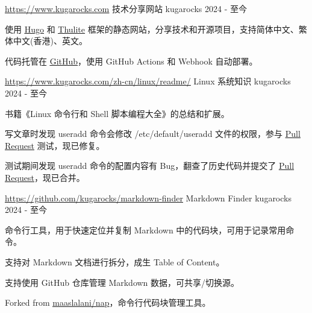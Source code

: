 

\begin{cventries}

  \cventry
    {\href{https://www.kugarocks.com}{\uline{https://www.kugarocks.com}}} %
    {技术分享网站} %
    {kugarocks} %
    {2024 - 至今} %
    {
      \begin{cvitems} %
        \item {使用 \href{https://gohugo.io/}{\uline{Hugo}} 和 \href{https://thulite.io/}{\uline{Thulite}} 框架的静态网站，分享技术和开源项目，支持简体中文、繁体中文(香港)、英文。}
        \item {代码托管在 \href{https://github.com/kugarocks/kugarocks.github.io}{\uline{GitHub}}，使用 GitHub Actions 和 Webhook 自动部署。}
      \end{cvitems}
    }

  \cventry
    {\href{https://www.kugarocks.com/zh-cn/linux/readme/}{\uline{https://www.kugarocks.com/zh-cn/linux/readme/}}} %
    {Linux 系统知识} %
    {kugarocks} %
    {2024 - 至今} %
    {
      \begin{cvitems} %
        \item {书籍《Linux 命令行和 Shell 脚本编程大全》的总结和扩展。}
        \item {写文章时发现 useradd 命令会修改 /etc/default/useradd 文件的权限，参与 \href{https://github.com/shadow-maint/shadow/pull/1083}{\uline{Pull Request}} 测试，现已修复。}
        \item {测试期间发现 useradd 命令的配置内容有 Bug，翻查了历史代码并提交了 \href{https://github.com/shadow-maint/shadow/pull/1086}{\uline{Pull Request}}，现已合并。}
      \end{cvitems}
    }

  \cventry
    {\href{https://github.com/kugarocks/markdown-finder}{\uline{https://github.com/kugarocks/markdown-finder}}} %
    {Markdown Finder} %
    {kugarocks} %
    {2024 - 至今} %
    {
      \begin{cvitems} %
        \item {命令行工具，用于快速定位并复制 Markdown 中的代码块，可用于记录常用命令。}
        \item {支持对 Markdown 文档进行拆分，成生 Table of Content。}
        \item {支持使用 GitHub 仓库管理 Markdown 数据，可共享/切换源。}
        \item {Forked from \href{https://github.com/maaslalani/nap}{\uline{maaslalani/nap}}，命令行代码块管理工具。}
      \end{cvitems}
    }


\end{cventries}
